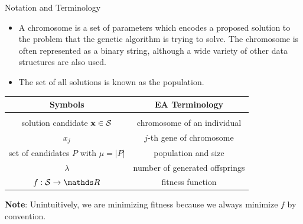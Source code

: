 \documentclass[11pt,compress,t,notes=noshow, xcolor=table]{beamer}
\begin{document}
\begin{vbframe}{Notation and Terminology}

\begin{footnotesize}
\begin{itemize}
\item A chromosome is a set of parameters which encodes a proposed solution to the problem that the genetic algorithm is trying to solve. The chromosome is often represented as a binary string, although a wide variety of other data structures are also used.\\
\item The set of all solutions is known as the population.
\end{itemize}
\end{footnotesize}

\medskip

\begin{center}
\begin{tabular}{c|c}
    \textbf{Symbols} & \textbf{EA Terminology} \\
    \hline\hline \\
    solution candidate $\mathbf{x} \in \mathcal{S}$ & chromosome of an individual \\[0.2em]
    $x_j$  & $j$-th gene of chromosome \\[0.2em]
    set of candidates $P$ with $\mu = |P|$ & population and size \\[0.2em]
    $\lambda$ & number of generated offsprings \\[0.2em]
    $f: \mathcal{S} \to \R$ & fitness function
\end{tabular}
\end{center}

\textbf{Note}: Unintuitively, we are minimizing fitness because we always minimize $f$ by convention.




\end{vbframe}
\end{document}
